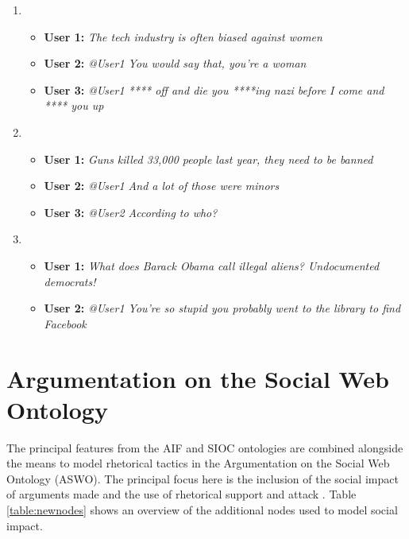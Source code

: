 \begin{enumerate}

\item 
\begin{itemize}
\item \textbf{User 1:} \textit{The tech industry is often biased against women}
\item \textbf{User 2:} \textit{@User1 You would say that, you're a woman}
\item \textbf{User 3:} \textit{@User1 **** off and die you ****ing nazi before I come and **** you up}
\end{itemize}

\item 
\begin{itemize}
\item \textbf{User 1:} \textit{Guns killed 33,000 people last year, they need to be banned}
\item \textbf{User 2:} \textit{@User1 And a lot of those were minors}
\item \textbf{User 3:} \textit{@User2 According to who?}
\end{itemize}

\item 
\begin{itemize}
\item \textbf{User 1:} \textit{What does Barack Obama call illegal aliens? Undocumented democrats!}
\item \textbf{User 2:} \textit{@User1 You're so stupid you probably went to the library to find Facebook}
\end{itemize}

\end{enumerate}

\section{Argumentation on the Social Web Ontology}
The principal features from the AIF and SIOC ontologies are combined alongside the means to model rhetorical tactics in the Argumentation on the Social Web Ontology (ASWO). The principal focus here is the inclusion of the social impact of arguments made and the use of rhetorical support and attack \citep{Blount2014, Blount2015}. Table \ref{table:newnodes} shows an overview of the additional nodes used to model social impact.

